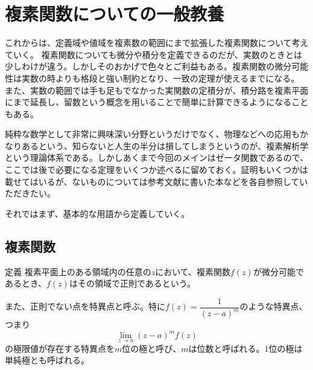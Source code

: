 \documentclass[11pt,b5paper,papersize,dvipdfmx]{jsbook}
\begin{document}
\section{複素関数についての一般教養} 
\label{sec:2}

これからは、定義域や値域を複素数の範囲にまで拡張した複素関数について考えていく。
複素関数についても微分や積分を定義できるのだが、実数のときとは少しわけが違う。しかしそのおかげで色々とご利益もある。複素関数の微分可能性は実数の時よりも格段と強い制約となり、一致の定理が使えるまでになる。
また、実数の範囲では手も足もでなかった実関数の定積分が、積分路を複素平面にまで延長し、留数という概念を用いることで簡単に計算できるようになることもある。\par
純粋な数学として非常に興味深い分野というだけでなく、物理などへの応用もかなりあるという、知らないと人生の半分は損してしまうというのが、複素解析学という理論体系である。しかしあくまで今回のメインはゼータ関数であるので、ここでは後で必要になる定理をいくつか述べるに留めておく。証明もいくつかは載せてはいるが、ないものについては参考文献に書いた本などを各自参照していただきたい。\par
それではまず、基本的な用語から定義していく。

\subsection{複素関数}

\begin{thm}{定義}
  複素平面上のある領域内の任意の$z$において、複素関数$f(z)$が微分可能であるとき、$f(z)$はその領域で正則であるという。\par
  また、正則でない点を特異点と呼ぶ。特に$f(z)=\dfrac1{(z-a)^m}$のような特異点、つまり
  $$ \lim_{z\to a} (z-a)^m f(z) $$
  の極限値が存在する特異点を$m$位の極と呼び、$m$は位数と呼ばれる。1位の極は単純極とも呼ばれる。
\end{thm}
\end{document}
